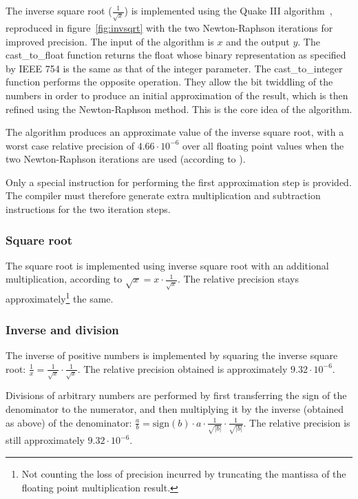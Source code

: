 \documentclass[a4paper,11pt]{kthesis}
\begin{document}
The inverse square root ($\frac{1}{\sqrt{x}}$) is implemented using the Quake III algorithm~\cite{invsqrt}, reproduced in figure~\ref{fig:invsqrt} with the two Newton-Raphson iterations for improved precision. The input of the algorithm is $x$ and the output $y$. The cast\_to\_float function returns the float whose binary representation as specified by IEEE 754 is the same as that of the integer parameter. The cast\_to\_integer function performs the opposite operation. They allow the bit twiddling of the numbers in order to produce an initial approximation of the result, which is then refined using the Newton-Raphson method. This is the core idea of the algorithm.

The algorithm produces an approximate value of the inverse square root, with a worst case relative precision of $4.66 \cdot 10^{-6}$ over all floating point values when the two Newton-Raphson iterations are used (according to \cite{invsqrt}).

Only a special instruction for performing the first approximation step is provided. The compiler must therefore generate extra multiplication and subtraction instructions for the two iteration steps.

\subsubsection{Square root}
The square root is implemented using inverse square root with an additional multiplication, according to $\sqrt{x} = x \cdot \frac{1}{\sqrt{x}}$. The relative precision stays approximately\footnote{Not counting the loss of precision incurred by truncating the mantissa of the floating point multiplication result.} the same.

\subsubsection{Inverse and division}
The inverse of positive numbers is implemented by squaring the inverse square root: $\frac{1}{x} = \frac{1}{\sqrt{x}} \cdot \frac{1}{\sqrt{x}}$. The relative precision obtained is approximately $9.32 \cdot 10^{-6}$.

Divisions of arbitrary numbers are performed by first transferring the sign of the denominator to the numerator, and then multiplying it by the inverse (obtained as above) of the denominator: $\frac{a}{b} = \textrm{sign}(b) \cdot a \cdot \frac{1}{\sqrt{|b|}} \cdot \frac{1}{\sqrt{|b|}}$. The relative precision is still approximately $9.32 \cdot 10^{-6}$.
\end{document}
